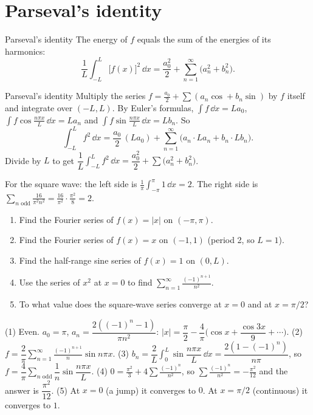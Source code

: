 \section{Parseval's identity}

\begin{defbox}{Parseval's identity}
The energy of $f$ equals the sum of the energies of its harmonics:
\[ \frac1L\int_{-L}^{L}\big[f(x)\big]^2\,\dd x = \frac{a_0^2}{2} + \sum_{n=1}^\infty\big(a_n^2 + b_n^2\big). \]
\end{defbox}

\begin{derivbox}{Parseval's identity}
Multiply the series $f = \frac{a_0}{2} + \sum(a_n\cos + b_n\sin)$ by $f$ itself and integrate over $(-L,L)$. By Euler's formulas, $\int f\,\dd x = La_0$, $\int f\cos\frac{n\pi x}{L}\,\dd x = La_n$ and $\int f\sin\frac{n\pi x}{L}\,\dd x = Lb_n$. So
\[ \int_{-L}^{L}f^2\,\dd x = \frac{a_0}{2}\,(La_0) + \sum_{n=1}^\infty\big(a_n\cdot La_n + b_n\cdot Lb_n\big). \]
Divide by $L$ to get $\dfrac1L\displaystyle\int_{-L}^{L}f^2\,\dd x = \dfrac{a_0^2}{2} + \sum\big(a_n^2 + b_n^2\big)$.
\end{derivbox}

For the square wave: the left side is $\frac1\pi\int_{-\pi}^{\pi}1\,\dd x = 2$. The right side is $\sum_{n\text{ odd}}\frac{16}{\pi^2n^2} = \frac{16}{\pi^2}\cdot\frac{\pi^2}{8} = 2$. \checkmark

\begin{practicebox}
\begin{enumerate}
  \item Find the Fourier series of $f(x)=|x|$ on $(-\pi,\pi)$.
  \item Find the Fourier series of $f(x)=x$ on $(-1,1)$ (period 2, so $L=1$).
  \item Find the half-range sine series of $f(x) = 1$ on $(0,L)$.
  \item Use the series of $x^2$ at $x=0$ to find $\displaystyle\sum_{n=1}^\infty\frac{(-1)^{n+1}}{n^2}$.
  \item To what value does the square-wave series converge at $x=0$ and at $x=\pi/2$?
\end{enumerate}
\end{practicebox}

\begin{answerbox}
(1) Even. $a_0 = \pi$, $a_n = \dfrac{2((-1)^n - 1)}{\pi n^2}$: $|x| = \dfrac\pi2 - \dfrac4\pi\Big(\cos x + \dfrac{\cos 3x}{9} + \cdots\Big)$. \quad (2) $f = \dfrac2\pi\displaystyle\sum_{n=1}^\infty\frac{(-1)^{n+1}}{n}\sin n\pi x$. \quad (3) $b_n = \dfrac{2}{L}\displaystyle\int_0^L\sin\dfrac{n\pi x}{L}\,\dd x = \dfrac{2(1-(-1)^n)}{n\pi}$, so $f = \dfrac4\pi\displaystyle\sum_{n\text{ odd}}\dfrac1n\sin\dfrac{n\pi x}{L}$. \quad (4) $0 = \frac{\pi^2}{3} + 4\sum\frac{(-1)^n}{n^2}$, so $\sum\frac{(-1)^n}{n^2} = -\frac{\pi^2}{12}$ and the answer is $\dfrac{\pi^2}{12}$. \quad (5) At $x = 0$ (a jump) it converges to $0$. At $x=\pi/2$ (continuous) it converges to $1$.
\end{answerbox}
